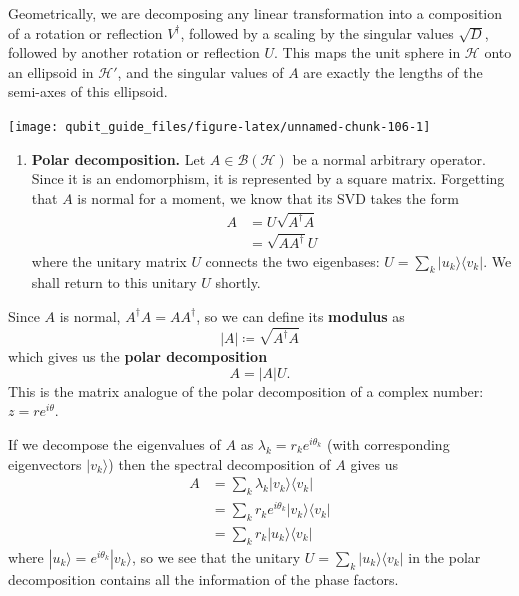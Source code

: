 \documentclass[fleqn,a4paper]{article}
\providecommand{\tightlist}{\setlength{\itemsep}{0pt}\setlength{\parskip}{0pt}}
\theoremstyle{definition}
\theoremstyle{definition}
\theoremstyle{definition}
\theoremstyle{definition}
\theoremstyle{remark}
\begin{document}
Geometrically, we are decomposing any linear transformation into a composition of a rotation or reflection \(V^\dagger\), followed by a scaling by the singular values \(\sqrt{D}\), followed by another rotation or reflection \(U\).
This maps the unit sphere in \(\mathcal{H}\) onto an ellipsoid in \(\mathcal{H}'\), and the singular values of \(A\) are exactly the lengths of the semi-axes of this ellipsoid.

\begin{center}\texttt{[image: qubit\_guide\_files/figure-latex/unnamed-chunk-106-1]} \end{center}

\begin{enumerate}
\def\labelenumi{\arabic{enumi}.}
\setcounter{enumi}{2}
\tightlist
\item
  \textbf{Polar decomposition.}
  Let \(A\in\mathcal{B}(\mathcal{H})\) be a normal arbitrary operator.
  Since it is an endomorphism, it is represented by a square matrix.
  Forgetting that \(A\) is normal for a moment, we know that its SVD takes the form
  \[
   \begin{aligned}
     A
     &= U\sqrt{A^\dagger A}
   \\&= \sqrt{AA^\dagger}U
   \end{aligned}
    \]
  where the unitary matrix \(U\) connects the two eigenbases: \(U=\sum_k|u_k\rangle\langle v_k|\).
  We shall return to this unitary \(U\) shortly.
\end{enumerate}

Since \(A\) is normal, \(A^\dagger A=AA^\dagger\), so we can define its \textbf{modulus} as
\[
    |A| \coloneqq \sqrt{A^\dagger A}
  \]
which gives us the \textbf{polar decomposition}
\[
    A = |A|U.
  \]
This is the matrix analogue of the polar decomposition of a complex number: \(z=re^{i\theta}\).

If we decompose the eigenvalues of \(A\) as \(\lambda_k=r_k e^{i\theta_k}\) (with corresponding eigenvectors \(|v_k\rangle\)) then the spectral decomposition of \(A\) gives us
\[
    \begin{aligned}
      A
      &= \sum_k \lambda_k|v_k\rangle\langle v_k|
    \\&= \sum_k r_ke^{i\theta_k}|v_k\rangle\langle v_k|
    \\&= \sum_k r_k|u_k\rangle\langle v_k|
    \end{aligned}
  \]
where \(|u_k\rangle=e^{i\theta_k}|v_k\rangle\), so we see that the unitary \(U=\sum_k|u_k\rangle\langle v_k|\) in the polar decomposition contains all the information of the phase factors.
\end{document}
